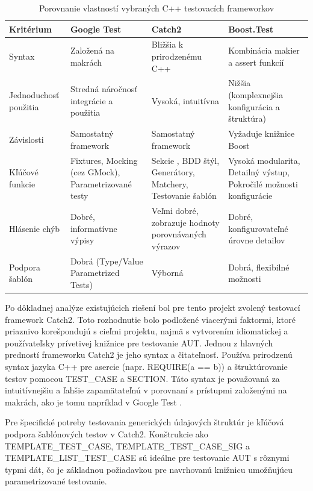 \documentclass[11pt]{article}
\begin{document}
\begin{table}[H]
 \centering
 \begin{tabularx}{\textwidth}{>{\raggedright\arraybackslash}p{3.2cm}>{\raggedright\arraybackslash}p{3.2cm}>{\raggedright\arraybackslash}p{3.2cm}>{\raggedright\arraybackslash}p{3.2cm}}
  \toprule
  \textbf{Kritérium} & \textbf{Google Test} & \textbf{Catch2} & \textbf{Boost.Test} \\
  \midrule
  Syntax & Založená na makrách & Bližšia k prirodzenému C++ & Kombinácia makier a assert funkcií \\
  \midrule
  Jednoduchosť použitia & Stredná náročnosť integrácie a použitia & Vysoká, intuitívna & Nižšia (komplexnejšia konfigurácia a štruktúra) \\
  \midrule
  Závislosti & Samostatný framework & Samostatný framework & Vyžaduje knižnice Boost \\
  \midrule
  Kľúčové funkcie & Fixtures, Mocking (cez GMock), Parametrizované testy & Sekcie , BDD štýl, Generátory, Matchery, Testovanie šablón & Vysoká modularita, Detailný výstup, Pokročilé možnosti konfigurácie \\
  \midrule
  Hlásenie chýb & Dobré, informatívne výpisy & Veľmi dobré, zobrazuje hodnoty porovnávaných výrazov & Dobré, konfigurovateľné úrovne detailov \\
  \midrule
  Podpora šablón & Dobrá (Type/Value Parametrized Tests) & Výborná & Dobrá, flexibilné možnosti \\
  \bottomrule
 \end{tabularx}
 \caption{Porovnanie vlastností vybraných C++ testovacích frameworkov}
 \label{tab:framework_comparison}
\end{table}

Po dôkladnej analýze existujúcich riešení bol pre tento projekt zvolený testovací framework Catch2. Toto rozhodnutie bolo podložené viacerými faktormi, ktoré priaznivo korešpondujú s cieľmi projektu, najmä s vytvorením idiomatickej a používateľsky prívetivej knižnice pre testovanie AUT. Jednou z hlavných predností frameworku Catch2 je jeho syntax a čitateľnosť. Používa prirodzenú syntax jazyka C++ pre asercie (napr. REQUIRE(a == b)) a štruktúrovanie testov pomocou TEST\_CASE a SECTION. Táto syntax je považovaná za intuitívnejšiu a ľahšie zapamätateľnú v porovnaní s prístupmi založenými na makrách, ako je tomu napríklad v Google Test \cite{github_catch2}.

Pre špecifické potreby testovania generických údajových štruktúr je kľúčová podpora šablónových testov v Catch2. Konštrukcie ako TEMPLATE\_TEST\_CASE, TEMPLATE\_TEST\_CASE\_SIG a TEMPLATE\_LIST\_TEST\_CASE sú ideálne pre testovanie AUT s rôznymi typmi dát, čo je základnou požiadavkou pre navrhovanú knižnicu umožňujúcu parametrizované testovanie.
\end{document}
